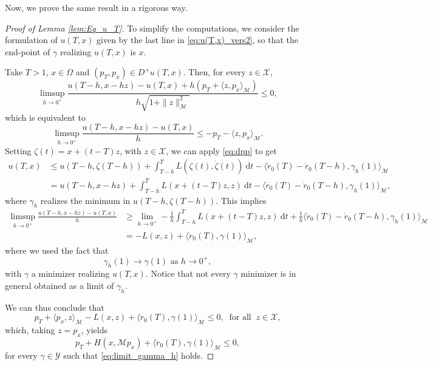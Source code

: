 \documentclass[a4paper,10pt]{amsart}
\newcommand{\ud}{\mathrm{d}}
\theoremstyle{plain}
\theoremstyle{definition}
\numberwithin{equation}{section}
\numberwithin{thm}{section}
\begin{document}
Now, we prove the same result in a rigorous way.

    \begin{proof}[Proof of Lemma \ref{lem:Eq_u_T}]
To simplify the computations, we consider the formulation of $u(T,x)$ given by the last line in \eqref{eq:u(T,x)_vers2}, so that the end-point of $\gamma$ realizing $u(T,x)$ is $x$.

\smallskip
Take $T>1$, $x\in\Omega$ and $(p_T,p_x)\in D^+ u(T,x)$. Then, for every $z\in\mathcal{X}$, 
\[
\limsup_{h\rightarrow0^+}\frac{u(T-h,x-hz)-u(T,x) + h(p_T + \langle z,p_x\rangle_\mathcal{M})}{h\sqrt{1+\|z\|_\mathcal{M}^2}}\leq 0,
\]
which is equivalent to
\[
\limsup_{h\rightarrow0^+}\frac{u(T-h,x-hz)-u(T,x)}{h}\leq -p_T - \langle z,p_x\rangle_\mathcal{M}.
\]
Setting $\zeta(t) = x + (t-T)z$, with $z\in\mathcal{X}$, we can apply \eqref{eq:dpp} to get
\[
\begin{split}
    u(T,x) &\leq u(T-h,\zeta(T-h)) + \int_{T-h}^{T}L(\zeta(t),\dot{\zeta}(t))\ \ud t - \langle \dot{r}_0(T)-\dot{r}_0(T-h),\gamma_h(1)\rangle_\mathcal{M}\\
    &=u(T-h,x-hz) + \int_{T-h}^{T}L(x+(t-T)z,z)\ \ud t - \langle \dot{r}_0(T)-\dot{r}_0(T-h),\gamma_h(1)\rangle_\mathcal{M},
\end{split}
\]
where $\gamma_h$ realizes the minimum in $u(T-h,\zeta(T-h))$. This implies
\[
\begin{split}
    \limsup_{h\rightarrow 0^+} \frac{u(T-h,x-hz)-u(T,x)}{h} &\geq \lim_{h\rightarrow0^+} -\frac{1}{h} \int_{T-h}^{T}L(x+(t-T)z,z)\ \ud t + \frac{1}{h} \langle \dot{r}_0(T)-\dot{r}_0(T-h),
{\gamma_h}(1)\rangle_\mathcal{M}\\
    &= -L(x,z) + \langle \ddot{r}_0(T),\gamma(1)\rangle_\mathcal{M},
\end{split}
\]
where we used the fact that 
\begin{equation}\label{eq:limit_gamma_h}
    \gamma_h(1)\rightarrow\gamma(1)\text{ as }h\rightarrow0^+,
\end{equation}
with $\gamma$ a minimizer realizing $u(T,x)$. Notice that not every $\gamma$ minimizer is in general obtained as a limit of $\gamma_h$.

\smallskip
We can thus conclude that 
\[
p_T + \langle p_x,z \rangle_\mathcal{M} - L(x,z) + \langle \ddot{r}_0(T),\gamma(1)\rangle_\mathcal{M} \leq 0, \ \mbox{ for all } \ z \in \mathcal X,
\]
which, taking $z=p_x$, yields 
\[
p_T + H(x,\mathcal M p_x) + \langle \ddot{r}_0(T),\gamma(1)\rangle_\mathcal{M} \leq 0,
\]
for every $\gamma \in \mathcal Y$ such that \eqref{eq:limit_gamma_h} holds.



\end{proof}
\end{document}
